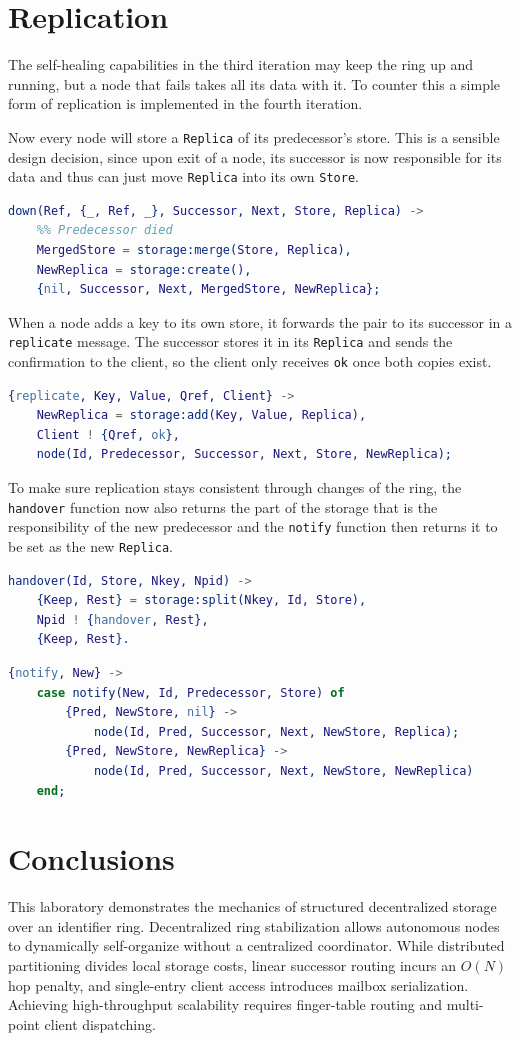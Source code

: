\documentclass[a4paper, 11pt]{article}
\begin{document}
\section{Replication}
The self-healing capabilities in the third iteration may keep the ring up and running, but a node that fails takes all its data with it. To counter this a simple form of replication is implemented in the fourth iteration.

Now every node will store a \texttt{Replica} of its predecessor's store. This is a sensible design decision, since upon exit of a node, its successor is now responsible for its data and thus can just move \texttt{Replica} into its own \texttt{Store}.
\begin{lstlisting}[language=erlang]
down(Ref, {_, Ref, _}, Successor, Next, Store, Replica) ->
    %% Predecessor died
    MergedStore = storage:merge(Store, Replica),
    NewReplica = storage:create(),
    {nil, Successor, Next, MergedStore, NewReplica};
\end{lstlisting}
When a node adds a key to its own store, it forwards the pair to its successor in a \texttt{replicate} message. The successor stores it in its \texttt{Replica} and sends the confirmation to the client, so the client only receives \texttt{ok} once both copies exist.
\begin{lstlisting}[language=erlang]
{replicate, Key, Value, Qref, Client} ->
    NewReplica = storage:add(Key, Value, Replica),
    Client ! {Qref, ok},
    node(Id, Predecessor, Successor, Next, Store, NewReplica);
\end{lstlisting}
To make sure replication stays consistent through changes of the ring, the \texttt{handover} function now also returns the part of the storage that is the responsibility of the new predecessor and the \texttt{notify} function then returns it to be set as the new \texttt{Replica}.
\begin{lstlisting}[language=erlang]
handover(Id, Store, Nkey, Npid) ->
    {Keep, Rest} = storage:split(Nkey, Id, Store),
    Npid ! {handover, Rest},
    {Keep, Rest}.
\end{lstlisting}
\begin{lstlisting}[language=erlang]
{notify, New} ->
    case notify(New, Id, Predecessor, Store) of
        {Pred, NewStore, nil} ->
            node(Id, Pred, Successor, Next, NewStore, Replica);
        {Pred, NewStore, NewReplica} ->
            node(Id, Pred, Successor, Next, NewStore, NewReplica)
    end;
\end{lstlisting}

\section{Conclusions}

This laboratory demonstrates the mechanics of structured decentralized storage over an identifier ring. Decentralized ring stabilization allows autonomous nodes to dynamically self-organize without a centralized coordinator. While distributed partitioning divides local storage costs, linear successor routing incurs an $O(N)$ hop penalty, and single-entry client access introduces mailbox serialization. Achieving high-throughput scalability requires finger-table routing and multi-point client dispatching.
\end{document}
